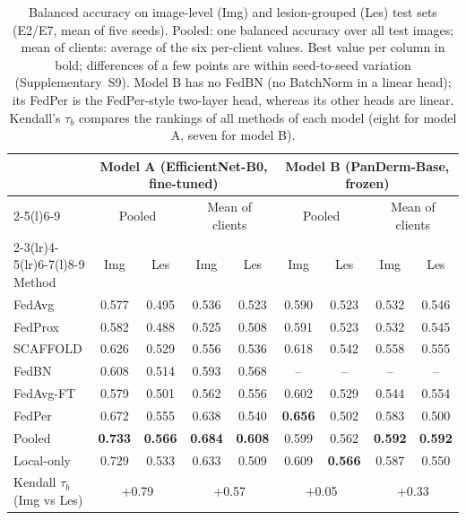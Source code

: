 \documentclass[VANCOUVER,Times1COL]{WileyNJDv5}
\begin{document}
\begin{table}[!t]
\centering
\caption{Balanced accuracy on image-level (Img) and lesion-grouped (Les) test sets (E2/E7, mean of five
seeds). Pooled: one balanced accuracy over all test images; mean of clients: average of the six per-client
values. Best value per column in bold; differences of a few points are within seed-to-seed variation
(Supplementary~S9). Model B has no FedBN (no BatchNorm in a linear head); its FedPer is the FedPer-style
two-layer head, whereas its other heads are linear. Kendall's $\tau_b$ compares the rankings of all
methods of each model (eight for model A, seven for model B).}
\label{tab:ba}
\setlength{\tabcolsep}{4.5pt}
\begin{tabular}{@{}lcccccccc@{}}
\toprule
 & \multicolumn{4}{c}{Model A (EfficientNet-B0, fine-tuned)} & \multicolumn{4}{c}{Model B (PanDerm-Base, frozen)} \\
\cmidrule(lr){2-5}\cmidrule(l){6-9}
 & \multicolumn{2}{c}{Pooled} & \multicolumn{2}{c}{Mean of clients} & \multicolumn{2}{c}{Pooled} & \multicolumn{2}{c}{Mean of clients} \\
\cmidrule(lr){2-3}\cmidrule(lr){4-5}\cmidrule(lr){6-7}\cmidrule(l){8-9}
Method & Img & Les & Img & Les & Img & Les & Img & Les \\
\midrule
FedAvg & 0.577 & 0.495 & 0.536 & 0.523 & 0.590 & 0.523 & 0.532 & 0.546 \\
FedProx & 0.582 & 0.488 & 0.525 & 0.508 & 0.591 & 0.523 & 0.532 & 0.545 \\
SCAFFOLD & 0.626 & 0.529 & 0.556 & 0.536 & 0.618 & 0.542 & 0.558 & 0.555 \\
FedBN & 0.608 & 0.514 & 0.593 & 0.568 & -- & -- & -- & -- \\
FedAvg-FT & 0.579 & 0.501 & 0.562 & 0.556 & 0.602 & 0.529 & 0.544 & 0.554 \\
FedPer & 0.672 & 0.555 & 0.638 & 0.540 & \textbf{0.656} & 0.502 & 0.583 & 0.500 \\
\midrule
Pooled & \textbf{0.733} & \textbf{0.566} & \textbf{0.684} & \textbf{0.608} & 0.599 & 0.562 & \textbf{0.592} & \textbf{0.592} \\
Local-only & 0.729 & 0.533 & 0.633 & 0.509 & 0.609 & \textbf{0.566} & 0.587 & 0.550 \\
\midrule
Kendall $\tau_b$ (Img vs Les) & \multicolumn{2}{c}{+0.79} & \multicolumn{2}{c}{+0.57} & \multicolumn{2}{c}{+0.05} & \multicolumn{2}{c}{+0.33} \\
\bottomrule
\end{tabular}
\end{table}
\end{document}
